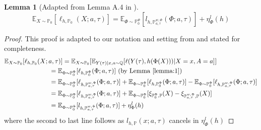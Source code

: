 \documentclass{article}
\newtheorem{lemma}{Lemma}
\begin{document}
\begin{lemma}[Adapted from Lemma A.4 in \cite{johansson2019support}]\label{Lemma:2}
\begin{equation*}
    \mathbb{E}_{X \sim \mathbb{P}_0}[\ell_{h, \mathbb{P}_0}(X; a, \tau)] =  \mathbb{E}_{\Phi \sim \mathbb{P}^\Phi_0}[l_{h, \mathbb{P}^{w, \Phi}_{a, \tau}}(\Phi; a, \tau)] + \eta^l_\Phi(h)
\end{equation*}
\end{lemma}
\begin{proof} This proof is adapted to our notation and setting from \cite{johansson2019support} and stated for completeness. 
\begin{equation*}
\begin{split}
     &\mathbb{E}_{X \sim \mathbb{P}_0}[\ell_{h, \mathbb{P}_0}(X; a, \tau)] 
     = \mathbb{E}_{X \sim \mathbb{P}_0}[\mathbb{E}_{Y(\tau)|x, a \sim \mathbb{Q}}[\ell(Y(\tau), h(\Phi(X)))|X=x, A=a]]\\
    &~~~~~~~~~~~~~~~~~~~~~= \mathbb{E}_{\Phi \sim \mathbb{P}^\Phi_0}[\ell_{h, \mathbb{P}^\Phi_0}(\Phi; a, \tau)]  \text{  (by Lemma \ref{lemma:1})} \\
    &~~~~~~~~~~~~~~~~~~~~~= \mathbb{E}_{\Phi \sim \mathbb{P}^\Phi_0}[\ell_{h, \mathbb{P}^{w,\Phi}_{a, \tau}}(\Phi; a, \tau)] + \mathbb{E}_{\Phi \sim \mathbb{P}^\Phi_0}[\ell_{h, \mathbb{P}^\Phi_0}(\Phi; a, \tau)] - \mathbb{E}_{\Phi \sim \mathbb{P}^{\Phi}_0}[\ell_{h, \mathbb{P}^{w,\Phi}_{a, \tau}}(\Phi; a, \tau)] \\
   &~~~~~~~~~~~~~~~~~~~~~=  \mathbb{E}_{\Phi \sim \mathbb{P}^\Phi_0}[\ell_{h, \mathbb{P}^{w,\Phi}_{a, \tau}}(\Phi; a, \tau)] + \mathbb{E}_{\Phi \sim \mathbb{P}^\Phi_0}[\xi_{ \mathbb{P}^\Phi_0, \mathbb{P}}(X) - \xi_{ \mathbb{P}^{w,\Phi}_{a, \tau}, \mathbb{P}}(X)]\\
   &~~~~~~~~~~~~~~~~~~~~~=  \mathbb{E}_{\Phi \sim \mathbb{P}^\Phi_0}[ l_{h, \mathbb{P}^{w, \Phi}_{a, \tau}}(\Phi; a, \tau)] + \eta^l_\Phi(h)
\end{split}
\end{equation*}
where the second to last line follows as $l_{h, \mathbb{P}}(x; a, \tau)$ cancels in $\eta^l_\Phi(h)$  \end{proof}
 
\end{document}
